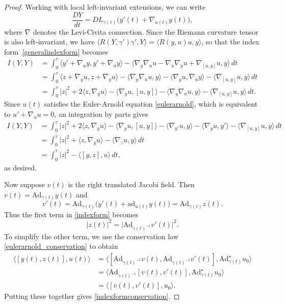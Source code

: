 \documentclass[oneside, 11pt]{amsart}
\numberwithin{equation}{section}
\newcommand{\ad}{\mathrm{ad}}
\newcommand{\Ad}{\mathrm{Ad}}
\newcommand{\Adstar}{\Ad^{\star}}
\begin{document}
\begin{proof}
Working with local left-invariant extensions, we can write
\begin{equation*}
\frac{D Y}{dt} = DL_{\gamma(t)}\big( y'(t) + \nabla_{u(t)} y(t) \big),
\end{equation*}
where $\nabla$ denotes the Levi-Civita connection. Since the Riemann curvature tensor is also left-invariant, we have $\langle R(Y,\gamma')\gamma', Y\rangle = \langle R(y,u)u, y\rangle$, so that the index form~\eqref{generalindexform} becomes 
    \begin{align*}
        I(Y,Y) &= \int_0^{\tau} \langle y'+\nabla_uy, y'+\nabla_uy\rangle - \langle \nabla_y\nabla_uu - \nabla_u\nabla_yu + \nabla_{[u,y]}u, y\rangle \, dt \\
         &= \int_0^{\tau} \langle z+\nabla_yu, z+\nabla_yu\rangle - \langle \nabla_y\nabla_uu, y\rangle - \langle \nabla_yu, \nabla_uy\rangle - \langle \nabla_{[u,y]}u, y\rangle \, dt \\
         &= \int_0^{\tau} \lvert z\rvert^2  +2 \langle z, \nabla_yu\rangle -
         \langle \nabla_yu, [u,y]\rangle -
         \langle \nabla_y\nabla_uu, y\rangle  - \langle \nabla_{[u,y]}u, y\rangle \, dt.
    \end{align*}
    Since $u(t)$ satisfies the Euler-Arnold equation \eqref{eulerarnold}, which is equivalent to $u' + \nabla_uu = 0$, an integration by parts gives 
    \begin{align*}
        I(Y,Y) &= 
    \int_0^{\tau} \lvert z\rvert^2  +2 \langle z, \nabla_yu\rangle -
         \langle \nabla_yu, [u,y]\rangle -
         \langle \nabla_{y'}u, y\rangle -
          \langle \nabla_yu, y'\rangle - \langle \nabla_{[u,y]}u, y\rangle \, dt \\ 
         &=     \int_0^{\tau} \lvert z\rvert^2  +  \langle z, \nabla_yu\rangle  -
         \langle \nabla_zu, y\rangle \, dt \\
         &=   \int_0^{\tau} \lvert z\rvert^2  - \langle [y,z], u\rangle \, dt,
    \end{align*}
    as desired.

Now suppose $v(t)$ is the right translated Jacobi field. Then $v(t) = \Ad_{\gamma(t)}y(t)$ and $$ v'(t) = \Ad_{\gamma(t)}\big( y'(t) + \ad_{u(t)}y(t)\big) = \Ad_{\gamma(t)}z(t).$$
Thus the first term in \eqref{indexform} becomes
$$\lvert z(t)\rvert^2 = \big\lvert \Ad_{\gamma(t)^{-1}} v'(t)\big\rvert^2. $$
To simplify the other term, we use the conservation law     \eqref{eulerarnold_conservation} to obtain 
 \begin{align*}
     \big\langle [y(t),z(t)], u(t)\big\rangle &= \big\langle [\Ad_{\gamma(t)^{-1}}v(t),\Ad_{\gamma(t)^{-1}} v'(t)], \Adstar_{\gamma(t)} u_0\big\rangle \\
     &= \big\langle \Ad_{\gamma(t)^{-1}} [v(t), v'(t)], \Adstar_{\gamma(t)} u_0\big\rangle \\
     &= \big\langle [v(t),v'(t)], u_0\big\rangle.
 \end{align*} 
 Putting these together gives \eqref{indexformconservation}.
\end{proof}
\end{document}
